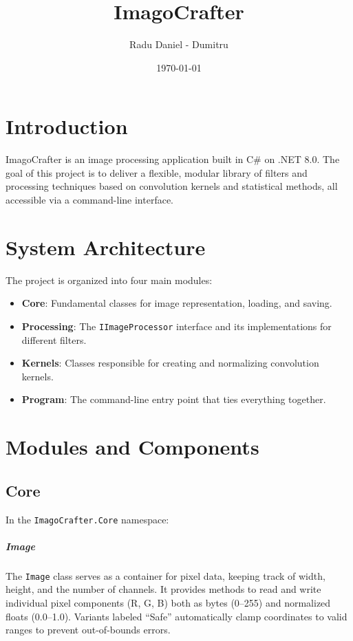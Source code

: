 \documentclass[12pt,a4paper]{report}
\title{ImagoCrafter}
\author{Radu Daniel - Dumitru}
\date{\today}
\begin{document}
\maketitle
\tableofcontents

\chapter{Introduction}
ImagoCrafter is an image processing application built in C# on .NET 8.0. The goal of this project is to deliver a flexible, modular library of filters and processing techniques based on convolution kernels and statistical methods, all accessible via a command-line interface.

\chapter{System Architecture}
The project is organized into four main modules:
\begin{itemize}
  \item \textbf{Core}: Fundamental classes for image representation, loading, and saving.
  \item \textbf{Processing}: The \texttt{IImageProcessor} interface and its implementations for different filters.
  \item \textbf{Kernels}: Classes responsible for creating and normalizing convolution kernels.
  \item \textbf{Program}: The command-line entry point that ties everything together.
\end{itemize}

\chapter{Modules and Components}

\section{Core}
In the \texttt{ImagoCrafter.Core} namespace:

\paragraph{Image}
The \texttt{Image} class serves as a container for pixel data, keeping track of width, height, and the number of channels. It provides methods to read and write individual pixel components (R, G, B) both as bytes (0–255) and normalized floats (0.0–1.0). Variants labeled “Safe” automatically clamp coordinates to valid ranges to prevent out-of-bounds errors.
\end{document}
